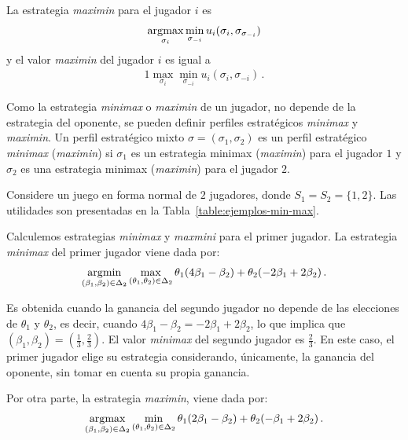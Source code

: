 \begin{definition}
La estrategia \textit{maximin} para el jugador $i$ es 
\begin{alignat}{1}
\operatorname*{\arg\!\max}_{\sigma_i}{\min_{\sigma_{-i}}{u_i(\sigma_i, \sigma_{\sigma_{-i}})}}
\end{alignat}
y el valor \textit{maximin} del jugador $i$ es igual a
\begin{alignat}{1}
\max_{\sigma_i}{\min_{\sigma_{-i}}{u_i(\sigma_i, \sigma_{-i})}} \,.
\end{alignat}
\end{definition}

Como la estrategia \textit{minimax} o \textit{maximin} de un jugador, no depende de la estrategia del oponente, se pueden definir perfiles estratégicos \textit{minimax} y \textit{maximin}. Un perfil estratégico mixto $\sigma = (\sigma_1, \sigma_2)$ es un perfil estratégico \textit{minimax} (\textit{maximin}) si $\sigma_1$ es un estrategia minimax (\textit{maximin}) para el jugador $1$ y $\sigma_2$ es una estrategia minimax (\textit{maximin}) para el jugador $2$.

\begin{example}
\label{ex:ejemplos-min-max}
Considere un juego en forma normal de $2$ jugadores, donde $S_1 = S_2 = \{1, 2\}$. Las utilidades son presentadas en la Tabla~\ref{table:ejemplos-min-max}.
\end{example}

Calculemos estrategias \textit{minimax} y \textit{maxmini} para el primer jugador. La estrategia \textit{minimax} del primer jugador viene dada por:
\begin{alignat}{1}
\operatorname*{\arg\!\min}_{(\beta_1, \beta_2) \in \Delta_2 }{\max_{(\theta_1, \theta_2) \in \Delta_2}
{\theta_1(4\beta_1 -\beta_2) + \theta_2(-2\beta_1 + 2\beta_2)}} \,.
\end{alignat}

Es obtenida cuando la ganancia del segundo jugador no depende de las elecciones de $\theta_1$ y $\theta_2$, es decir, cuando $4\beta_1 - \beta_2 = -2\beta_1 + 2\beta_2$, lo que implica que $(\beta_1, \beta_2) = \left(\frac{1}{3}, \frac{2}{3} \right)$. El valor \textit{minimax} del segundo jugador es $\frac{2}{3}$. En este caso, el primer jugador elige su estrategia considerando, únicamente, la ganancia del oponente, sin tomar en cuenta su propia ganancia.

Por otra parte, la estrategia \textit{maximin}, viene dada por:
\begin{alignat}{1}
\operatorname*{\arg\!\max}_{(\beta_1, \beta_2) \in \Delta_2 }{\min_{(\theta_1, \theta_2) \in \Delta_2}
{\theta_1(2\beta_1 -\beta_2) + \theta_2(-\beta_1 + 2\beta_2)}} \,.
\end{alignat}

